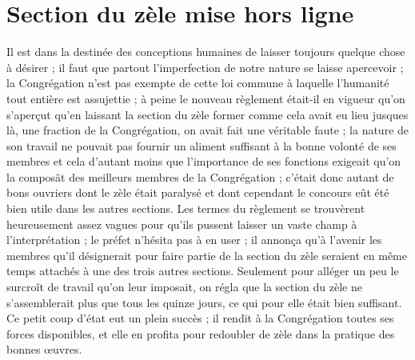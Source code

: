 \section*{Section du zèle mise hors ligne}
Il est dans la destinée des conceptions humaines de laisser toujours quelque chose à désirer ; il faut que partout l'imperfection de notre nature se laisse apercevoir ; la Congrégation n'est pas exempte de cette loi commune à laquelle l'humanité tout entière est assujettie ; à peine le nouveau règlement était-il en vigueur qu'on s'aperçut qu'en laissant la section du zèle former comme cela avait eu lieu jusques là, une fraction de la Congrégation, on avait fait une véritable faute ; la nature de son travail ne pouvait pas fournir un aliment suffisant à la bonne volonté de ses membres et cela d'autant moins que l'importance de ses fonctions exigeait qu'on la composât des meilleurs membres de la Congrégation ; c'était donc autant de bons ouvriers dont le zèle était paralysé et dont cependant le concours eût été bien utile dans les autres sections. Les termes du règlement se trouvèrent heureusement assez vagues pour qu'ils pussent laisser un vaste champ à l'interprétation ; le préfet n'hésita pas à en user ; il annonça qu'à l'avenir les membres qu'il désignerait pour faire partie de la section du zèle seraient en même temps attachés à une des trois autres sections. Seulement pour alléger un peu le surcroît
de travail qu'on leur imposait, on régla que la section du zèle ne s'assemblerait plus que tous les quinze jours, ce qui pour elle était bien suffisant. Ce petit coup d'état eut un plein succès ; il rendit à la Congrégation toutes ses forces disponibles, et elle en profita pour redoubler de zèle dans la pratique des bonnes œuvres.

